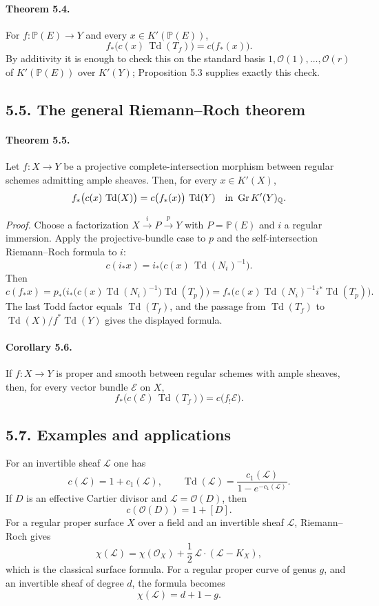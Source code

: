 \documentclass[12pt]{article}
\newcommand{\QQ}{\mathbb Q}
\newcommand{\bP}{\mathbb P}
\newcommand{\cO}{\mathcal O}
\newcommand{\cL}{\mathcal L}
\newcommand{\cE}{\mathcal E}
\newcommand{\Gr}{\operatorname{Gr}}
\newcommand{\Todd}{\operatorname{Td}}
\newcommand{\xto}[1]{\xrightarrow{#1}}
\begin{document}
\paragraph{Theorem 5.4.}
For $f:\bP(E)\to Y$ and every $x\in K'(\bP(E))$,
\[
 f_*\bigl(c(x)\,\Todd(T_f)\bigr)=c\bigl(f_*(x)\bigr).
\]
By additivity it is enough to check this on the standard basis $1,\cO(1),\ldots,\cO(r)$ of $K'(\bP(E))$ over $K'(Y)$; Proposition 5.3 supplies exactly this check.

\subsection*{5.5. The general Riemann--Roch theorem}

\paragraph{Theorem 5.5.}
Let $f:X\to Y$ be a projective complete-intersection morphism between regular schemes admitting ample sheaves. Then, for every $x\in K'(X)$,
\[
 f_*\bigl(c(x)\,\Todd(X)\bigr)=c\bigl(f_*(x)\bigr)\,\Todd(Y)
 \quad\hbox{in }\Gr K'(Y)_\QQ .
\]

\emph{Proof.}
Choose a factorization $X\xto{i}P\xto{p}Y$ with $P=\bP(E)$ and $i$ a regular immersion. Apply the projective-bundle case to $p$ and the self-intersection Riemann--Roch formula to $i$:
\[
 c(i_*x)=i_*\bigl(c(x)\,\Todd(N_i)^{-1}\bigr).
\]
Then
\[
 c(f_*x)=p_*\bigl(i_*\bigl(c(x)\Todd(N_i)^{-1}\bigr)\Todd(T_p)\bigr)
       =f_*\bigl(c(x)\Todd(N_i)^{-1}i^*\Todd(T_p)\bigr).
\]
The last Todd factor equals $\Todd(T_f)$, and the passage from $\Todd(T_f)$ to $\Todd(X)/f^*\Todd(Y)$ gives the displayed formula.

\paragraph{Corollary 5.6.}
If $f:X\to Y$ is proper and smooth between regular schemes with ample sheaves, then, for every vector bundle $\cE$ on $X$,
\[
 f_*\bigl(c(\cE)\,\Todd(T_f)\bigr)=c\bigl(f_!\cE\bigr).
\]

\subsection*{5.7. Examples and applications}

For an invertible sheaf $\cL$ one has
\[
 c(\cL)=1+c_1(\cL),\qquad
 \Todd(\cL)=\frac{c_1(\cL)}{1-e^{-c_1(\cL)}}.
\]
If $D$ is an effective Cartier divisor and $\cL=\cO(D)$, then
\[
 c(\cO(D))=1+[D].
\]
For a regular proper surface $X$ over a field and an invertible sheaf $\cL$, Riemann--Roch gives
\[
\chi(\cL)=\chi(\cO_X)+\frac12\,\cL\cdot(\cL-K_X),
\]
which is the classical surface formula. For a regular proper curve of genus $g$, and an invertible sheaf of degree $d$, the formula becomes
\[
 \chi(\cL)=d+1-g.
\]
\end{document}
